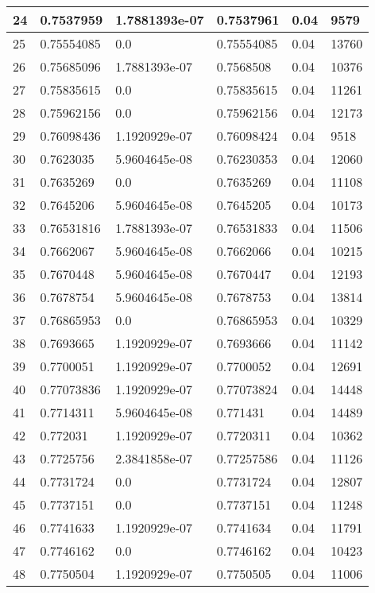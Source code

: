 \begin{longtable}{|l|l|l|l|l|l|}
24 & 0.7537959 & 1.7881393e-07 & 0.7537961 & 0.04 & 9579 \\ \hline 
25 & 0.75554085 & 0.0 & 0.75554085 & 0.04 & 13760 \\ \hline 
26 & 0.75685096 & 1.7881393e-07 & 0.7568508 & 0.04 & 10376 \\ \hline 
27 & 0.75835615 & 0.0 & 0.75835615 & 0.04 & 11261 \\ \hline 
28 & 0.75962156 & 0.0 & 0.75962156 & 0.04 & 12173 \\ \hline 
29 & 0.76098436 & 1.1920929e-07 & 0.76098424 & 0.04 & 9518 \\ \hline 
30 & 0.7623035 & 5.9604645e-08 & 0.76230353 & 0.04 & 12060 \\ \hline 
31 & 0.7635269 & 0.0 & 0.7635269 & 0.04 & 11108 \\ \hline 
32 & 0.7645206 & 5.9604645e-08 & 0.7645205 & 0.04 & 10173 \\ \hline 
33 & 0.76531816 & 1.7881393e-07 & 0.76531833 & 0.04 & 11506 \\ \hline 
34 & 0.7662067 & 5.9604645e-08 & 0.7662066 & 0.04 & 10215 \\ \hline 
35 & 0.7670448 & 5.9604645e-08 & 0.7670447 & 0.04 & 12193 \\ \hline 
36 & 0.7678754 & 5.9604645e-08 & 0.7678753 & 0.04 & 13814 \\ \hline 
37 & 0.76865953 & 0.0 & 0.76865953 & 0.04 & 10329 \\ \hline 
38 & 0.7693665 & 1.1920929e-07 & 0.7693666 & 0.04 & 11142 \\ \hline 
39 & 0.7700051 & 1.1920929e-07 & 0.7700052 & 0.04 & 12691 \\ \hline 
40 & 0.77073836 & 1.1920929e-07 & 0.77073824 & 0.04 & 14448 \\ \hline 
41 & 0.7714311 & 5.9604645e-08 & 0.771431 & 0.04 & 14489 \\ \hline 
42 & 0.772031 & 1.1920929e-07 & 0.7720311 & 0.04 & 10362 \\ \hline 
43 & 0.7725756 & 2.3841858e-07 & 0.77257586 & 0.04 & 11126 \\ \hline 
44 & 0.7731724 & 0.0 & 0.7731724 & 0.04 & 12807 \\ \hline 
45 & 0.7737151 & 0.0 & 0.7737151 & 0.04 & 11248 \\ \hline 
46 & 0.7741633 & 1.1920929e-07 & 0.7741634 & 0.04 & 11791 \\ \hline 
47 & 0.7746162 & 0.0 & 0.7746162 & 0.04 & 10423 \\ \hline 
48 & 0.7750504 & 1.1920929e-07 & 0.7750505 & 0.04 & 11006 \\ \hline 

\end{longtable}
